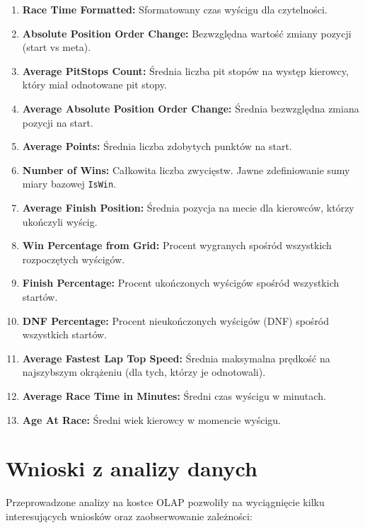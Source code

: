 \documentclass[a4paper,12pt]{article}
\begin{document}
\begin{enumerate}[label=\arabic*., wide, labelindent=0pt]
  \item \textbf{Race Time Formatted:} Sformatowany czas wyścigu dla czytelności.
  \item \textbf{Absolute Position Order Change:} Bezwzględna wartość zmiany pozycji (start vs meta).
  \item \textbf{Average PitStops Count:} Średnia liczba pit stopów na występ kierowcy, który miał odnotowane pit stopy.
  \item \textbf{Average Absolute Position Order Change:} Średnia bezwzględna zmiana pozycji na start.
  \item \textbf{Average Points:} Średnia liczba zdobytych punktów na start.
  \item \textbf{Number of Wins:} Całkowita liczba zwycięstw. Jawne zdefiniowanie sumy miary bazowej \texttt{IsWin}.
  \item \textbf{Average Finish Position:} Średnia pozycja na mecie dla kierowców, którzy ukończyli wyścig.
  \item \textbf{Win Percentage from Grid:} Procent wygranych spośród wszystkich rozpoczętych wyścigów.
  \item \textbf{Finish Percentage:} Procent ukończonych wyścigów spośród wszystkich startów.
  \item \textbf{DNF Percentage:} Procent nieukończonych wyścigów (DNF) spośród wszystkich startów.
  \item \textbf{Average Fastest Lap Top Speed:} Średnia maksymalna prędkość na najszybszym okrążeniu (dla tych, którzy je odnotowali).
  \item \textbf{Average Race Time in Minutes:} Średni czas wyścigu w minutach.
  \item \textbf{Age At Race:} Średni wiek kierowcy w momencie wyścigu.
\end{enumerate}

\section{Wnioski z analizy danych}

Przeprowadzone analizy na kostce OLAP pozwoliły na wyciągnięcie kilku interesujących wniosków oraz zaobserwowanie zależności:
\end{document}
